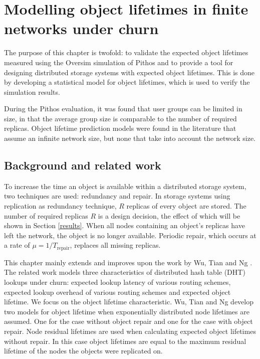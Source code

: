 \chapter{Modelling object lifetimes in finite networks under churn}
\label{chp:MODELLING}

The purpose of this chapter is twofold: to validate the expected object lifetimes measured using the Oversim simulation of Pithos and to provide a tool for designing distributed storage systems with expected object lifetimes. This is done by developing a statistical model for object lifetimes, which is used to verify the simulation results.

During the Pithos evaluation, it was found that user groups can be limited in size, in that the average group size is comparable to the number of required replicas. Object lifetime prediction models were found in the literature that assume an infinite network size, but none that take into account the network size.

\section{Background and related work}
\label{model_related_work}

To increase the time an object is available within a distributed storage system, two techniques are used: redundancy and repair. In storage systems using replication as redundancy technique, $R$ replicas of every object are stored. The number of required replicas $R$ is a design decision, the effect of which will be shown in Section \ref{results}. When all nodes containing an object's replicas have left the network, the object is no longer available. Periodic repair, which occurs at a rate of $\mu = 1/T_{\textrm{repair}}$, replaces all missing replicas.

This chapter mainly extends and improves upon the work by Wu, Tian and Ng \cite{replication_article}. The related work models three characteristics of distributed hash table (DHT) lookups under churn: expected lookup latency of various routing schemes, expected lookup overhead of various routing schemes and expected object lifetime. We focus on the object lifetime characteristic. Wu, Tian and Ng develop two models for object lifetime when exponentially distributed node lifetimes are assumed. One for the case without object repair and one for the case with object repair. Node residual lifetimes are used when calculating expected object lifetimes without repair. In this case object lifetimes are equal to the maximum residual lifetime of the nodes the objects were replicated on.

